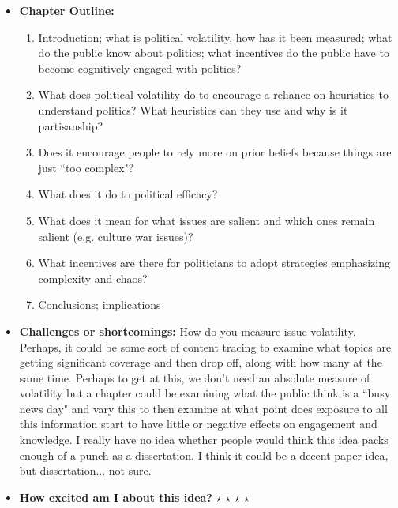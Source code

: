 \documentclass[12pt]{article}
\begin{document}
\begin{itemize}
        \item \textbf{Chapter Outline:}
        \begin{enumerate}
            \item Introduction; what is political volatility, how has it been measured; what do the public know about politics; what incentives do the public have to become cognitively engaged with politics?
            \item What does political volatility do to encourage a reliance on heuristics to understand politics? What heuristics can they use and why is it partisanship? 
            \item Does it encourage people to rely more on prior beliefs because things are just ``too complex"?
            \item What does it do to political efficacy?
            \item What does it mean for what issues are salient and which ones remain salient (e.g. culture war issues)?
            \item What incentives are there for politicians to adopt strategies emphasizing complexity and chaos?
            \item Conclusions; implications
        \end{enumerate}
        \item \textbf{Challenges or shortcomings:} How do you measure issue volatility. Perhaps, it could be some sort of content tracing to examine what topics are getting significant coverage and then drop off, along with how many at the same time. Perhaps to get at this, we don't need an absolute measure of volatility but a chapter could be examining what the public think is a ``busy news day" and vary this to then examine at what point does exposure to all this information start to have little or negative effects on engagement and knowledge. I really have no idea whether people would think this idea packs enough of a punch as a dissertation. I think it could be a decent paper idea, but dissertation... not sure.
        \item \textbf{How excited am I about this idea?} $\star$ $\star$ $\star$ $\star$
    \end{itemize}
\end{document}
